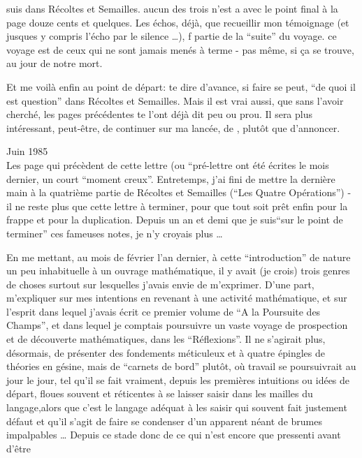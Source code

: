 
suis dans  Récoltes et Semailles.  aucun des trois n'est a avec le point final\handwritten{,} à la page douze cents et quelques. Les échos, déjà, que  recueillir mon témoignage (et jusques y compris l'écho par le silence \ldots), f partie de la ``suite'' du voyage.  ce voyage  est de ceux qui ne sont jamais menés à terme - pas même, si ça se trouve, au jour de notre mort.

Et me voilà  enfin  au point de départ: te dire d'avance, si faire se peut, ``de quoi il est question'' dans Récoltes et Semailles. Mais il est vrai aussi, que sans l'avoir cherché, les pages précédentes te l'ont déjà dit peu ou prou. Il sera plus intéressant, peut-être, de continuer  sur ma lancée,  de , plutôt que d'annoncer.

Juin 1985\\

 Les page qui précèdent de cette lettre (ou ``pré-lettre ont été écrites  le mois dernier,  un court ``moment creux''. Entretemps, j'ai fini de mettre la dernière main à la quatrième partie de Récoltes et Semailles (``Les Quatre Opérations'') - il ne reste plus que cette lettre à terminer, pour que tout soit prêt enfin pour la frappe et pour la duplication. Depuis  un an et demi que je suis``sur le point de terminer'' ces fameuses notes, je n'y croyais plus \ldots

En me mettant, au mois de février l'an dernier, à cette ``introduction'' de nature un peu inhabituelle à un ouvrage mathématique, il y avait (je crois) trois genres de choses surtout sur lesquelles j'avais envie de m'exprimer. D'une part,  m'expliquer sur mes intentions en revenant à une activité mathématique, et sur l'esprit dans lequel j'avais écrit ce premier volume de ``A la Poursuite des Champs'', et dans lequel je comptais poursuivre un vaste voyage de prospection et de découverte mathématiques, dans les ``Réflexions''.\deleted{(} Il ne s'agirait plus, désormais, de présenter des fondements méticuleux et à quatre épingles de théories en gésine, mais de ``carnets de bord'' plutôt, où  travail  se poursuivrait au jour le jour, tel qu'il se fait vraiment, depuis les premières intuitions ou idées de départ, floues souvent  et réticentes à se laisser saisir dans les mailles du langage,\deleted{(}alors que c'est le langage adéquat à les saisir qui souvent fait justement défaut et qu'il s'agit de faire se condenser d'un apparent néant de brumes  impalpables \ldots{} Depuis ce stade donc de ce qui n'est encore que pressenti avant d'être

